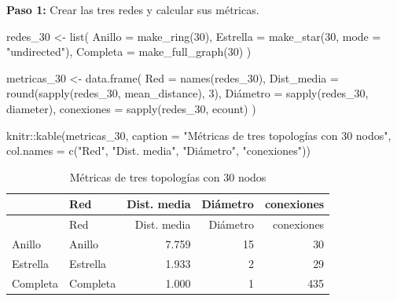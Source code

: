 \documentclass[
  letterpaper,
  DIV=11,
  numbers=noendperiod]{scrreprt}
\newenvironment{Shaded}{\begin{snugshade}}{\end{snugshade}}
\newcommand{\AttributeTok}[1]{\textcolor[rgb]{0.40,0.45,0.13}{#1}}
\newcommand{\DecValTok}[1]{\textcolor[rgb]{0.68,0.00,0.00}{#1}}
\newcommand{\FunctionTok}[1]{\textcolor[rgb]{0.28,0.35,0.67}{#1}}
\newcommand{\NormalTok}[1]{\textcolor[rgb]{0.00,0.23,0.31}{#1}}
\newcommand{\OtherTok}[1]{\textcolor[rgb]{0.00,0.23,0.31}{#1}}
\newcommand{\SpecialCharTok}[1]{\textcolor[rgb]{0.37,0.37,0.37}{#1}}
\newcommand{\StringTok}[1]{\textcolor[rgb]{0.13,0.47,0.30}{#1}}
\begin{document}
\begin{tcolorbox}[enhanced jigsaw, toprule=.15mm, colframe=quarto-callout-tip-color-frame, coltitle=black, titlerule=0mm, colback=white, breakable, leftrule=.75mm, arc=.35mm, bottomtitle=1mm, toptitle=1mm, rightrule=.15mm, bottomrule=.15mm, left=2mm, title=\textcolor{quarto-callout-tip-color}{\faLightbulb}\hspace{0.5em}{📝 Solución}, colbacktitle=quarto-callout-tip-color!10!white, opacityback=0, opacitybacktitle=0.6]

\textbf{Paso 1:} Crear las tres redes y calcular sus métricas.

\begin{Shaded}
\begin{Highlighting}[]
\NormalTok{redes\_30 }\OtherTok{\textless{}{-}} \FunctionTok{list}\NormalTok{(}
  \AttributeTok{Anillo   =} \FunctionTok{make\_ring}\NormalTok{(}\DecValTok{30}\NormalTok{),}
  \AttributeTok{Estrella =} \FunctionTok{make\_star}\NormalTok{(}\DecValTok{30}\NormalTok{, }\AttributeTok{mode =} \StringTok{"undirected"}\NormalTok{),}
  \AttributeTok{Completa =} \FunctionTok{make\_full\_graph}\NormalTok{(}\DecValTok{30}\NormalTok{)}
\NormalTok{)}

\NormalTok{metricas\_30 }\OtherTok{\textless{}{-}} \FunctionTok{data.frame}\NormalTok{(}
  \AttributeTok{Red =} \FunctionTok{names}\NormalTok{(redes\_30),}
  \AttributeTok{Dist\_media =} \FunctionTok{round}\NormalTok{(}\FunctionTok{sapply}\NormalTok{(redes\_30, mean\_distance), }\DecValTok{3}\NormalTok{),}
\NormalTok{  Diámetro }\OtherTok{=} \FunctionTok{sapply}\NormalTok{(redes\_30, diameter),}
  \AttributeTok{conexiones =} \FunctionTok{sapply}\NormalTok{(redes\_30, ecount)}
\NormalTok{)}

\NormalTok{knitr}\SpecialCharTok{::}\FunctionTok{kable}\NormalTok{(metricas\_30,}
             \AttributeTok{caption =} \StringTok{"Métricas de tres topologías con 30 nodos"}\NormalTok{,}
             \AttributeTok{col.names =} \FunctionTok{c}\NormalTok{(}\StringTok{"Red"}\NormalTok{, }\StringTok{"Dist. media"}\NormalTok{, }\StringTok{"Diámetro"}\NormalTok{, }\StringTok{"conexiones"}\NormalTok{))}
\end{Highlighting}
\end{Shaded}

\begin{longtable}[]{@{}llrrr@{}}
\caption{Métricas de tres topologías con 30 nodos}\tabularnewline
\toprule\noalign{}
& Red & Dist. media & Diámetro & conexiones \\
\midrule\noalign{}
\endfirsthead
\toprule\noalign{}
& Red & Dist. media & Diámetro & conexiones \\
\midrule\noalign{}
\endhead
\bottomrule\noalign{}
\endlastfoot
Anillo & Anillo & 7.759 & 15 & 30 \\
Estrella & Estrella & 1.933 & 2 & 29 \\
Completa & Completa & 1.000 & 1 & 435 \\
\end{longtable}


\end{tcolorbox}
\end{document}

